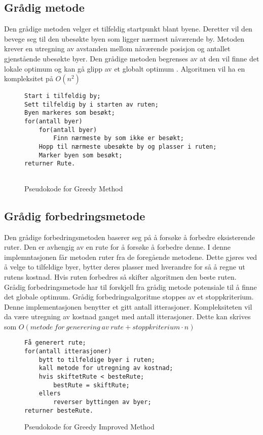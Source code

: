 \documentclass[12pt]{article}
\begin{document}
	\subsection{Grådig metode}
		Den grådige metoden velger et tilfeldig startpunkt blant byene. Deretter vil den bevege seg til den
		ubesøkte byen som ligger nærmest nåværende by. Metoden krever en utregning av avstanden mellom nåværende posisjon og antallet gjenstående ubesøkte byer. Den grådige metoden begrenses av at den vil finne det lokale optimum og kan gå glipp av et globalt optimum \cite{black2004dictionary}. Algoritmen vil ha en kompleksitet på $O(n^2)$\\

\begin{figure}[h]
	\begin{lstlisting}[frame=single]
Start i tilfeldig by;
Sett tilfeldig by i starten av ruten;
Byen markeres som besøkt;
for(antall byer)
	for(antall byer)
		Finn nærmeste by som ikke er besøkt;
	Hopp til nærmeste ubesøkte by og plasser i ruten;
	Marker byen som besøkt;
returner Rute.
		
	\end{lstlisting}
	\caption{Pseudokode for Greedy Method}
\end{figure} 

\subsection{Grådig forbedringsmetode}
Den grådige forbedringsmetoden baserer seg på å forsøke å forbedre eksisterende ruter. Den er avhengig av en rute for å forsøke å forbedre denne. I denne implemntasjonen får metoden ruter fra de foregående metodene. Dette gjøres ved å velge to tilfeldige byer, bytter deres plasser med hverandre for så å regne ut rutens kostnad. Hvis ruten forbedres så skifter algoritmen den beste ruten. Grådig forbedringsmetode har til forskjell fra grådig metode potensiale til å finne det globale optimum. Grådig forbedringsalgoritme stoppes av et stoppkriterium. Denne implementasjonen benytter et gitt antall itterasjoner. Kompleksiteten vil da være utregning av kostnad ganget med antall itterasjoner. Dette kan skrives som $O(metode\ for\ generering\ av\ rute + stoppkriterium\cdot n)$  \\

\begin{figure}[h]
\begin{lstlisting}[frame=single]
Få generert rute;
for(antall itterasjoner)
	bytt to tilfeldige byer i ruten;
	kall metode for utregning av kostnad;
	hvis skiftetRute < besteRute;
		bestRute = skiftRute;
	ellers
		reverser byttingen av byer;
returner besteRute.
\end{lstlisting} 
\caption{Pseudokode for Greedy Improved Method}
\end{figure}
\end{document}
